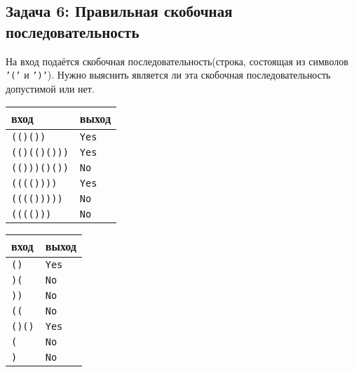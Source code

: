 \documentclass{article}
\begin{document}
\subsection*{Задача 6: Правильная скобочная последовательность}
На вход подаётся скобочная последовательность(строка, состоящая из символов \texttt{'('} и \texttt{')'}). Нужно выяснить является ли эта скобочная последовательность допустимой или нет.
\begin{multicols}{2}
\begin{center}
\begin{tabular}{ l | l }
 вход & выход \\ \hline
 \texttt{(()())} & \texttt{Yes} \\
 \texttt{(()(()()))} & \texttt{Yes} \\
 \texttt{(()))()())} & \texttt{No} \\
 \texttt{(((())))} & \texttt{Yes} \\
 \texttt{(((()))))} & \texttt{No} \\
 \texttt{(((()))} & \texttt{No} \\
\end{tabular}
\end{center}

\begin{center}
\begin{tabular}{ l | l }
 вход & выход \\ \hline
 \texttt{()} & \texttt{Yes} \\
 \texttt{)(} & \texttt{No} \\
 \texttt{))} & \texttt{No} \\
 \texttt{((} & \texttt{No} \\
 \texttt{()()} & \texttt{Yes} \\
 \texttt{(} & \texttt{No} \\
 \texttt{)} & \texttt{No} \\
\end{tabular}
\end{center}
\end{multicols}
\end{document}
